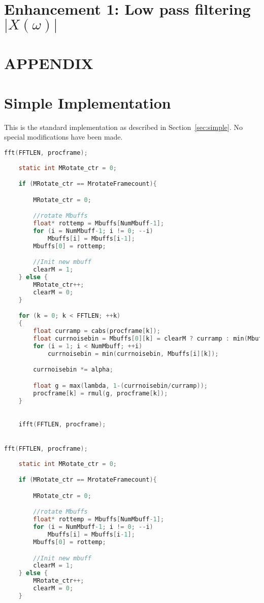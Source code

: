 \documentclass[11pt]{article} %
\begin{document}
\section{Enhancement 1: Low pass filtering $\lvert X(\omega) \rvert $} 

\section{APPENDIX} 
\appendix
\section{Simple Implementation} 
\label{app:simple}

This is the standard implementation as described in Section~\ref{sec:simple}. No special modifications have been made. 
  \begin{center}
    \begin{lstlisting}[language = C]
fft(FFTLEN, procframe);
									
    static int MRotate_ctr = 0;

	if (MRotate_ctr == MrotateFramecount){

		MRotate_ctr = 0;

		//rotate Mbuffs
		float* rottemp = Mbuffs[NumMbuff-1];
		for (i = NumMbuff-1; i != 0; --i)
			Mbuffs[i] = Mbuffs[i-1];
		Mbuffs[0] = rottemp;

		//Init new mbuff
		clearM = 1;
	} else {
		MRotate_ctr++;
		clearM = 0;
	}

	for (k = 0; k < FFTLEN; ++k)
	{
		float curramp = cabs(procframe[k]); 
		float currnoisebin = Mbuffs[0][k] = clearM ? curramp : min(Mbuffs[0][k], curramp);
		for (i = 1; i < NumMbuff; ++i)
			currnoisebin = min(currnoisebin, Mbuffs[i][k]);

		currnoisebin *= alpha;

		float g = max(lambda, 1-(currnoisebin/curramp));
		procframe[k] = rmul(g, procframe[k]);
	}

	
	ifft(FFTLEN, procframe);


fft(FFTLEN, procframe);
									
    static int MRotate_ctr = 0;

	if (MRotate_ctr == MrotateFramecount){

		MRotate_ctr = 0;

		//rotate Mbuffs
		float* rottemp = Mbuffs[NumMbuff-1];
		for (i = NumMbuff-1; i != 0; --i)
			Mbuffs[i] = Mbuffs[i-1];
		Mbuffs[0] = rottemp;

		//Init new mbuff
		clearM = 1;
	} else {
		MRotate_ctr++;
		clearM = 0;
	}


\end{lstlisting}
\end{center}
\end{document}
